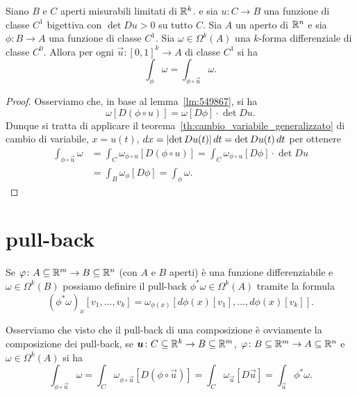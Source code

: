 \begin{theorem}
  Siano $B$ e $C$ aperti misurabili limitati di ${\mathbb R}^k$.
  e sia $u\colon C\to B$ una funzione di classe $C^1$ bigettiva con $\det Du > 0$ su tutto $C$.
  Sia $A$ un aperto di ${\mathbb R}^n$ e
  sia $\phi\colon B\to A$ una funzione di classe $C^1$.
  Sia $\omega\in \Omega^k(A)$ una $k$-forma differenziale di classe $C^0$.
  Allora per ogni $\vec u\colon [0,1]^k \to A$ di classe $C^1$ si ha
  \[
    \int_{\phi} \omega = \int_{\phi \circ \vec u} \omega.
  \]
\end{theorem}
%
\begin{proof}
Osserviamo che, in base al lemma~\ref{lm:549867}, si ha 
\[
  \omega [D(\phi\circ u)] = \omega[D\phi] \cdot \det Du.
\]
Dunque si tratta di applicare il teorema~\ref{th:cambio_variabile_generalizzato} di cambio di variabile,
$x=u(t)$, $dx = {\left|\det Du(t)\right|}\, dt = \det Du(t)\, dt$
per ottenere
\begin{align*}
  \int_{\phi\circ \vec u} \omega 
  &= \int_C \omega_{\phi\circ u}[D(\phi\circ u)] 
  = \int_C \omega_{\phi\circ u}[D\phi] \cdot \det Du \\
  &= \int_B \omega_{\phi}[D\phi]
  = \int_{\phi} \omega.
\end{align*}
\end{proof}

\section{pull-back}

Se $\varphi\colon A\subseteq {\mathbb R}^m \to B\subseteq {\mathbb R}^n$ (con $A$ e $B$ aperti) 
è una funzione differenziabile e $\omega\in \Omega^k(B)$
possiamo definire il pull-back $\phi^* \omega \in \Omega^k(A)$ tramite la formula
\[
  (\phi^* \omega)_x[v_1,\dots,v_k] 
  = \omega_{\phi(x)}[d\phi(x)[v_1],\dots, d\phi(x)[v_k]].
\]

Osserviamo che visto che il pull-back di una composizione è ovviamente 
la composizione dei pull-back, se $\boldsymbol u \colon C\subseteq {\mathbb R}^k \to B\subseteq {\mathbb R}^m$, 
$\varphi\colon B\subseteq {\mathbb R}^m\to A\subseteq {\mathbb R}^n$ e $\omega\in \Omega^k(A)$
si ha 
\[
  \int_{\phi \circ \vec u} \omega 
  = \int_C \omega_{\phi\circ \vec u}[D(\phi\circ \vec u)]
  = \int_C \omega_{\vec u}[D\vec u]
  = \int_{\vec u} \phi^* \omega.
\]

